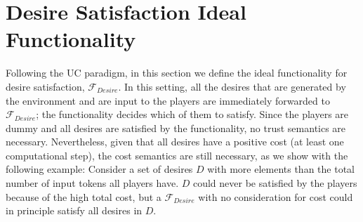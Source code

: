 \section{Desire Satisfaction Ideal Functionality}
  Following the UC paradigm, in this section we define the ideal functionality for desire satisfaction, $\mathcal{F}_{Desire}$.
  In this setting, all the desires that are generated by the environment and are input to the players are immediately forwarded
  to $\mathcal{F}_{Desire}$; the functionality decides which of them to satisfy. Since the players are dummy and all desires
  are satisfied by the functionality, no trust semantics are necessary. Nevertheless, given that all desires have a positive
  cost (at least one computational step), the cost semantics are still necessary, as we show with the following example:
  Consider a set of desires $D$ with more elements than the total number of input tokens all players have. $D$ could never be
  satisfied by the players because of the high total cost, but a $\mathcal{F}_{Desire}$ with no consideration for cost could in
  principle satisfy all desires in $D$. 
